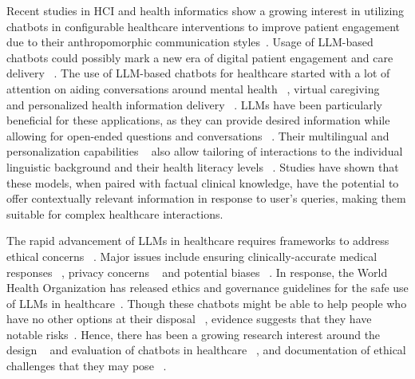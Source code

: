 
Recent studies in HCI and health informatics show a growing interest in utilizing chatbots in configurable healthcare interventions to improve patient engagement due to their anthropomorphic communication styles~\cite{singhal2023large, shahsavar2023role, zhou2023survey, sallam2023chatgpt, parmar2022health}. Usage of LLM-based chatbots could possibly mark a new era of digital patient engagement and care delivery ~\cite{ruggiano2021chatbots, shahsavar2023role}. The use of LLM-based chatbots for healthcare started with a lot of attention on aiding conversations around mental health ~\cite{song2024typing, althoff2016large, yang2023towards,10.1145/3613904.3642761}, virtual caregiving ~\cite{ruggiano2021chatbots, miura2022assisting, wang2021evaluation} and personalized health information delivery ~\cite{harrington2023trust, almalki2020health, skjuve2018chatbots}. LLMs have been particularly beneficial for these applications, as they can provide desired information while allowing for open-ended questions and conversations ~\cite{jovanovic2020chatbots, holmes2019usability, dolianiti2020chatbots,10.1145/3544548.3581503}. Their multilingual and personalization capabilities ~\cite{kocaballi2019personalization, liu2022effects, ait2023power,10.1145/3613905.3651093} also allow tailoring of interactions to the individual linguistic background and their health literacy levels ~\cite{marzo2024bridging}. Studies have shown that these models, when paired with factual clinical knowledge, have the potential to offer contextually relevant information in response to user's queries, making them suitable for complex healthcare interactions. 

The rapid advancement of LLMs in healthcare requires frameworks to address ethical concerns ~\cite{song2024typing, sepahpour2020ethical, chen2023chatbots, 10.1145/3613904.3642385}.
Major issues include ensuring clinically-accurate medical responses ~\cite{abbasian2024foundation, goodman2023accuracy}, privacy concerns ~\cite{li2023security, kanter2023health} and potential biases ~\cite{kim2023assessing}. In response, the World Health Organization has released ethics and governance guidelines for the safe use of LLMs in healthcare~\cite{whoguidelines}. Though these chatbots might be able to help people who have no other options at their disposal ~\cite{song2024typing}, evidence suggests that they have notable risks~\cite{song2024typing, sepahpour2020ethical}. Hence, there has been a growing research interest around the design ~\cite{wilson2022development, tsengunder, griffin2023chatbot} and evaluation of chatbots in healthcare ~\cite{cascella2023evaluating, denecke2021evaluation}, and documentation of ethical challenges that they may pose ~\cite{sepahpour2020ethical, li2023security}. 

